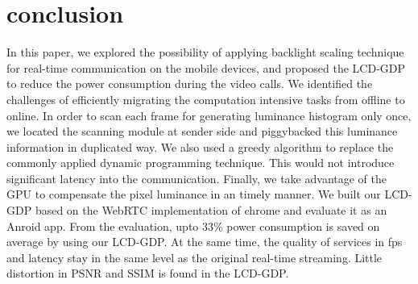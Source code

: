 \section{conclusion}
\label{sec:conclusion}

In this paper, we explored the possibility of applying backlight
scaling technique for real-time communication on the mobile devices,
and proposed the LCD-GDP to reduce the power consumption during the
video calls. We identified the challenges of efficiently migrating the
computation intensive tasks from offline to online. In order to scan
each frame for generating luminance histogram only once, we located
the scanning module at sender side and piggybacked this luminance
information in duplicated way. We also used a greedy algorithm to
replace the commonly applied dynamic programming technique. This would
not introduce significant latency into the communication. Finally, we
take advantage of the GPU to compensate the pixel luminance in an
timely manner. We built our LCD-GDP based on the WebRTC implementation
of chrome and evaluate it as an Anroid app. From the evaluation, upto
$33\%$ power consumption is saved on average by using our LCD-GDP. At
the same time, the quality of services in fps and latency stay in the
same level as the original real-time streaming. Little distortion in
PSNR and SSIM is found in the LCD-GDP.

